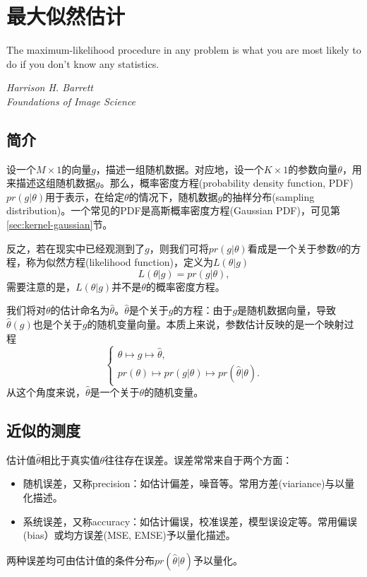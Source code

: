 \chapter{最大似然估计}
\label{sec:mle}

\epigraph{The maximum-likelihood procedure in any problem is what you are most likely to do if you don’t know any statistics.}{\textit{Harrison H. Barrett \\ Foundations of Image Science}}

\section{简介}
\label{sec:mle-intro}
设一个$M \times 1$的向量$g$，描述一组随机数据。对应地，设一个$K \times 1$的参数向量$\theta$，用来描述这组随机数据$g$。那么，概率密度方程(probability density function, PDF) $pr(g|\theta)$用于表示，在给定$\theta$的情况下，随机数据$g$的抽样分布(sampling distribution)。一个常见的PDF是高斯概率密度方程(Gaussian PDF)，可见第\ref{sec:kernel-gaussian}节。

反之，若在现实中已经观测到了$g$，则我们可将$pr(g|\theta)$看成是一个关于参数$\theta$的方程，称为似然方程(likelihood function)，定义为$L(\theta | g)$
\begin{equation*}
  L(\theta | g) = pr(g | \theta),
\end{equation*}
需要注意的是，$L(\theta | g)$并不是$\theta$的概率密度方程。

我们将对$\theta$的估计命名为$\hat{\theta}$。$\hat{\theta}$是个关于$g$的方程：由于$g$是随机数据向量，导致$\hat{\theta}(g)$也是个关于$g$的随机变量向量。本质上来说，参数估计反映的是一个映射过程
\begin{equation*}
  \begin{cases}
    \theta \mapsto g \mapsto \hat{\theta}, \\
    pr(\theta) \mapsto pr(g | \theta) \mapsto pr(\hat{\theta} | \theta).
  \end{cases}
\end{equation*}
从这个角度来说，$\hat{\theta}$是一个关于$\theta$的随机变量。

\section{近似的测度}
\label{sec:mle-performance-metrics}
估计值$\hat{\theta}$相比于真实值$\theta$往往存在误差。误差常常来自于两个方面：
\begin{itemize}
  \item 随机误差，又称precision：如估计偏差，噪音等。常用方差(viariance)与以量化描述。
  \item 系统误差，又称accuracy：如估计偏误，校准误差，模型误设定等。常用偏误(bias）或均方误差(MSE, EMSE)予以量化描述。
\end{itemize}
两种误差均可由估计值的条件分布$pr(\hat{\theta} | \theta)$予以量化。

